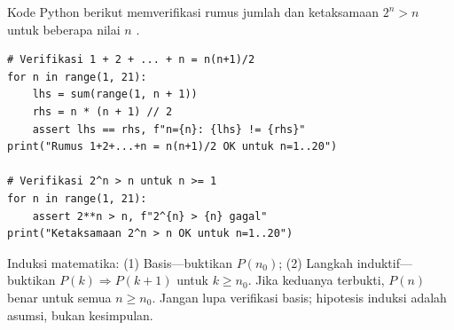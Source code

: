 Kode Python berikut memverifikasi rumus jumlah dan ketaksamaan $2^n > n$ untuk beberapa nilai $n$ \cite{python_docs_boolean}.

\begin{lstlisting}[style=pythonstyle, caption={Verifikasi numerik rumus $1+2+\cdots+n = n(n+1)/2$ dan $2^n > n$}]
# Verifikasi 1 + 2 + ... + n = n(n+1)/2
for n in range(1, 21):
    lhs = sum(range(1, n + 1))
    rhs = n * (n + 1) // 2
    assert lhs == rhs, f"n={n}: {lhs} != {rhs}"
print("Rumus 1+2+...+n = n(n+1)/2 OK untuk n=1..20")

# Verifikasi 2^n > n untuk n >= 1
for n in range(1, 21):
    assert 2**n > n, f"2^{n} > {n} gagal"
print("Ketaksamaan 2^n > n OK untuk n=1..20")
\end{lstlisting}

\begin{konsep}
Induksi matematika: (1) Basis---buktikan $P(n_0)$; (2) Langkah induktif---buktikan $P(k) \Rightarrow P(k+1)$ untuk $k \geq n_0$. Jika keduanya terbukti, $P(n)$ benar untuk semua $n \geq n_0$. Jangan lupa verifikasi basis; hipotesis induksi adalah asumsi, bukan kesimpulan.
\end{konsep}
